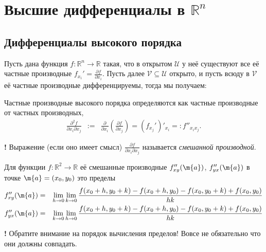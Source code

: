 \chapter{Высшие дифференциалы в $\mathbb{R}^n$}


\section{Дифференциалы высокого порядка}

Пусть дана функция $f: \mathbb{R}^n \to \mathbb{R}$ такая, что в открытом $\mathscr{U}$ у неё существуют все её частные производные $f_{x_i}' = \frac{\partial f}{\partial x_i}$. Пусть далее $\mathscr{V} \subseteq \mathscr{U}$ открыто, и пусть всюду в $\mathscr{V}$ её частные производные дифференцируемы, тогда мы получаем:
\begin{definition}
    Частные производные высокого порядка определяются как частные производные от частных производных, \ie
    \begin{eqnarray*}
        \frac{\partial^2 f}{\partial x_i \partial x_j} &:=& \frac{\partial }{\partial x_i}\left( \frac{\partial f}{\partial x_j} \right) = (f_{x_j}')'_{x_i} =: f''_{x_ix_j}. 
    \end{eqnarray*}
\end{definition}

\begin{mydanger}{\bf{!}}
    Выражение (если оно имеет смысл) $\frac{\partial f}{\partial x_i \partial x_j}$ называется \textit{смешанной производной}.
\end{mydanger}

\begin{lemma}\label{f''_xy}
    Для функции $f:\mathbb{R}^2 \to \mathbb{R}$ её смешанные производные $f''_{xy}(\m{a})$, $f''_{yx}(\m{a})$ в точке $\m{a} = (x_0,y_0)$ это пределы
\begin{eqnarray*}
    f''_{xy}(\m{a}) &=& \lim_{h\to 0} \lim_{k\to 0} \frac{f(x_0 + h, y_0 + k) - f(x_0 + h, y_0) - f(x_0,y_0 +k) + f(x_0,y_0)}{hk} \\
    f''_{yx}(\m{a}) &=& \lim_{k\to 0} \lim_{h\to 0} \frac{f(x_0 + h, y_0 + k) - f(x_0 + h, y_0) - f(x_0,y_0 +k) + f(x_0,y_0)}{hk}
\end{eqnarray*}
\end{lemma}

\begin{mydangerr}{\bf !}
    Обратите внимание на порядок вычисления пределов! Вовсе не обязательно что они должны совпадать.
\end{mydangerr}

